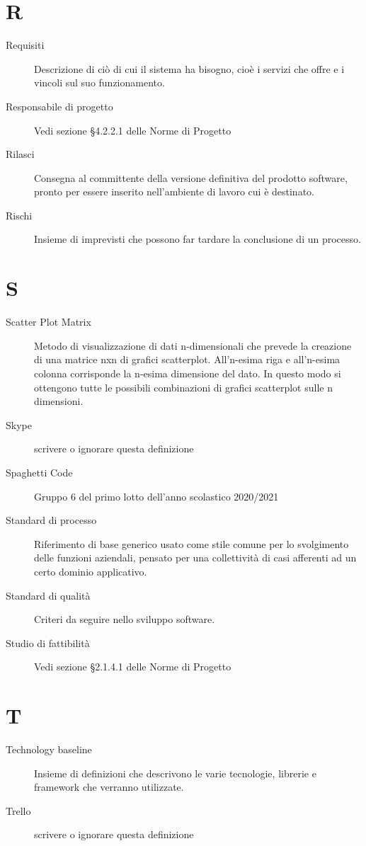 \documentclass{article}
\begin{document}
\section{R}
\begin{description}
  \item[Requisiti] Descrizione di ciò di cui il sistema ha bisogno, cioè i servizi che offre e i vincoli sul suo funzionamento.
  \item[Responsabile di progetto] Vedi sezione \S4.2.2.1 delle Norme di Progetto
  \item[Rilasci] Consegna al committente della versione definitiva del prodotto software, pronto per essere inserito nell’ambiente di lavoro cui è destinato. 
  \item[Rischi] Insieme di imprevisti che possono far tardare la conclusione di un processo.  
\end{description}
\newpage
\section{S}
\begin{description}
  \item[Scatter Plot Matrix] Metodo di visualizzazione di dati n-dimensionali che prevede la creazione di una matrice nxn di grafici scatterplot. All’n-esima riga e all’n-esima colonna corrisponde la n-esima dimensione del dato. In questo modo si ottengono tutte le possibili combinazioni di grafici scatterplot sulle n dimensioni.
  \item[Skype] {scrivere o ignorare questa definizione}
  \item[Spaghetti Code] Gruppo 6 del primo lotto dell'anno scolastico 2020/2021
  \item[Standard di processo] Riferimento di base generico usato come stile comune per lo svolgimento delle funzioni aziendali, pensato per una collettività di casi afferenti ad un certo dominio applicativo.
  \item[Standard di qualità] Criteri da seguire nello sviluppo software.
  \item[Studio di fattibilità] Vedi sezione \S2.1.4.1 delle Norme di Progetto
\end{description}
\newpage
\section{T}
\begin{description}
  \item[Technology baseline] Insieme di definizioni che descrivono le varie tecnologie, librerie e framework che verranno utilizzate.
  \item[Trello] {scrivere o ignorare questa definizione}
\end{description}
\newpage
\end{document}

